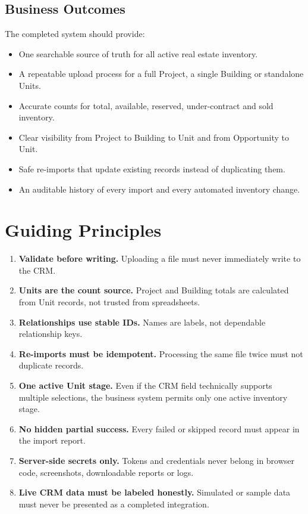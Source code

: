 \documentclass[10pt]{article}
\begin{document}
\subsection{Business Outcomes}
The completed system should provide:
\begin{itemize}
\item One searchable source of truth for all active real estate inventory.
\item A repeatable upload process for a full Project, a single Building or standalone Units.
\item Accurate counts for total, available, reserved, under-contract and sold inventory.
\item Clear visibility from Project to Building to Unit and from Opportunity to Unit.
\item Safe re-imports that update existing records instead of duplicating them.
\item An auditable history of every import and every automated inventory change.
\end{itemize}

\section{Guiding Principles}
\begin{enumerate}
\item \textbf{Validate before writing.} Uploading a file must never immediately write to the CRM.
\item \textbf{Units are the count source.} Project and Building totals are calculated from Unit records, not trusted from spreadsheets.
\item \textbf{Relationships use stable IDs.} Names are labels, not dependable relationship keys.
\item \textbf{Re-imports must be idempotent.} Processing the same file twice must not duplicate records.
\item \textbf{One active Unit stage.} Even if the CRM field technically supports multiple selections, the business system permits only one active inventory stage.
\item \textbf{No hidden partial success.} Every failed or skipped record must appear in the import report.
\item \textbf{Server-side secrets only.} Tokens and credentials never belong in browser code, screenshots, downloadable reports or logs.
\item \textbf{Live CRM data must be labeled honestly.} Simulated or sample data must never be presented as a completed integration.
\end{enumerate}
\end{document}
